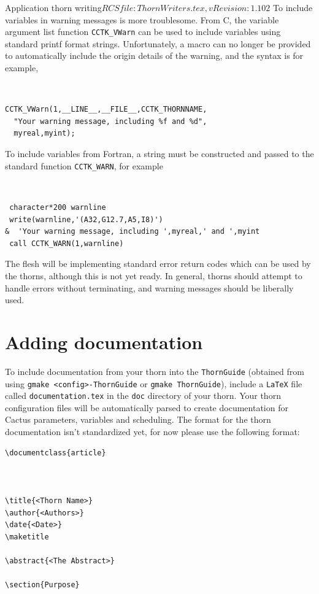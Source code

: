 \begin{cactuspart}{2}{Application thorn writing}{$RCSfile: ThornWriters.tex,v $}{$Revision: 1.102 $}
To include variables in warning messages is more troublesome. From C, the
variable argument list
function {\tt CCTK\_VWarn} can be used to include variables using standard printf format strings. Unfortunately, a macro can no
longer be provided to automatically include the origin details of the warning,
and the syntax is for example,
{\tt
\begin{verbatim}
CCTK_VWarn(1,__LINE__,__FILE__,CCTK_THORNNAME,
  "Your warning message, including %f and %d",
  myreal,myint);
\end{verbatim}
}
To include variables from Fortran, a string must be constructed and passed
to the standard function {\tt CCTK\_WARN}, for example
{\tt
\begin{verbatim}
 character*200 warnline
 write(warnline,'(A32,G12.7,A5,I8)')
&  'Your warning message, including ',myreal,' and ',myint
 call CCTK_WARN(1,warnline)
\end{verbatim}
}

The flesh will be implementing standard error return codes
which can be used by the thorns, although this is not
yet ready. In general, thorns should attempt to handle errors
without terminating, and warning messages should be liberally
used.




\section{Adding documentation}

To include documentation from your thorn into the {\tt ThornGuide}
(obtained from using {\tt gmake <config>-ThornGuide} or
{\tt gmake ThornGuide}), include a {\tt LaTeX} file called {\tt documentation.tex}
in the {\tt doc} directory of your thorn. Your thorn configuration
files will be automatically parsed to create documentation for
Cactus parameters, variables and scheduling. The format
for the thorn documentation isn't standardized yet, for now please use
the following format:
\begin{verbatim}
\documentclass{article}



\title{<Thorn Name>}
\author{<Authors>}
\date{<Date>}
\maketitle

\abstract{<The Abstract>}

\section{Purpose}


\end{verbatim}
\end{cactuspart}
